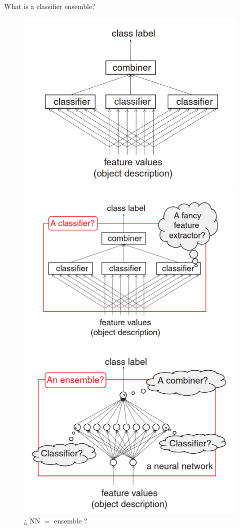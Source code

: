 \documentclass[xcolor=table]{beamer}
\begin{document}
\begin{frame}{What is a classifier ensemble?}

\begin{figure}[ht] 
  \label{ fig7} 
  \begin{minipage}[b]{0.5\linewidth}
    \centering
    \includegraphics[width=.5\linewidth]{Images/1.png} 
    \caption{Classifier ensemble} 
    \vspace{4ex}
  \end{minipage}%
  \pause
  \begin{minipage}[b]{0.5\linewidth}
    \centering
    \includegraphics[width=.5\linewidth]{Images/2.png} 
    \caption{¿ Ensemble \(=\) classifier ? (term) } 
    \vspace{4ex}
  \end{minipage} 
  \pause
  \begin{minipage}[b]{0.5\linewidth}
    \centering
    \includegraphics[width=.5\linewidth]{Images/3.png} 
    \caption{¿ NN \(=\) ensemble ?} 
    \vspace{4ex}

\end{minipage}
\end{figure}
\end{frame}
\end{document}
